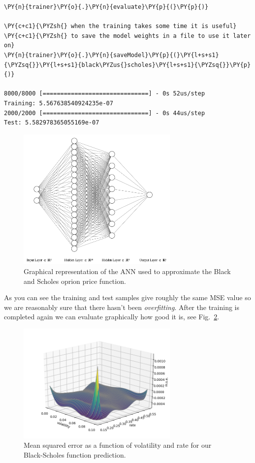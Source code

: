 \begin{tcolorbox}[breakable, size=fbox, boxrule=1pt, pad at break*=1mm,colback=cellbackground, colframe=cellborder]
\begin{Verbatim}[commandchars=\\\{\}]
\PY{n}{trainer}\PY{o}{.}\PY{n}{evaluate}\PY{p}{(}\PY{p}{)}
	
\PY{c+c1}{\PYZsh{} when the training takes some time it is useful}
\PY{c+c1}{\PYZsh{} to save the model weights in a file to use it later on}
\PY{n}{trainer}\PY{o}{.}\PY{n}{saveModel}\PY{p}{(}\PY{l+s+s1}{\PYZsq{}}\PY{l+s+s1}{black\PYZus{}scholes}\PY{l+s+s1}{\PYZsq{}}\PY{p}{)}

8000/8000 [==============================] - 0s 52us/step
Training: 5.567638540924235e-07
2000/2000 [==============================] - 0s 44us/step
Test: 5.582978365055169e-07
\end{Verbatim}
\end{tcolorbox}

\begin{figure}[htb]
	\centering
	\includegraphics[width=0.7\textwidth]{figures/ann_2.png}
	\caption{Graphical representation of the ANN used to approximate the Black and Scholes oprion price function.}
        \label{fig:ann_2}
\end{figure}

As you can see the training and test samples give roughly the same MSE
value so we are reasonably sure that there hasn't been
\emph{overfitting}.
After the training is completed again we can
evaluate graphically how good it is, see Fig.~\ref{fig:vol_rate}. 

\begin{figure}[htb]
	\centering
	\includegraphics[width=0.7\textwidth]{figures/vol_rate}
	\caption{Mean squared error as a function of volatility and rate for our Black-Scholes function prediction.}
	\label{fig:vol_rate}
\end{figure}

